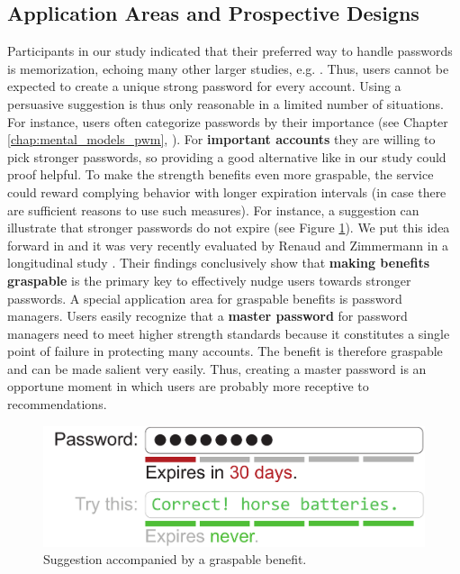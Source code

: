 \subsection{Application Areas and Prospective Designs}
Participants in our study indicated that their preferred way to handle passwords is memorization, echoing many other larger studies, e.g. \cite{CSID2012PasswordHabits, Olmstead2017AmerciansCybersecurity}. Thus, users cannot be expected to create a unique strong password for every account. Using a persuasive suggestion is thus only reasonable in a limited number of situations. For instance, users often categorize passwords by their importance (see Chapter \ref{chap:mental_models_pwm}, \cite{Stobert2014PasswordLifeCycle, Wash2016UnderstandingPasswordChoices}). For \textbf{important accounts} they are willing to pick stronger passwords, so providing a good alternative like in our study could proof helpful. To make the strength benefits even more graspable, the service could reward complying behavior with longer expiration intervals (in case there are sufficient reasons to use such measures). For instance, a suggestion can illustrate that stronger passwords do not expire (see Figure \ref{fig:decoy:expiremockup}). We put this idea forward in \cite{Seitz2016SuggestionsDecoy} and it was very recently evaluated by Renaud and Zimmermann in a longitudinal study \cite{Renaud2018NudgingFolks}. Their findings conclusively show that \textbf{making benefits graspable} is the primary key to effectively nudge users towards stronger passwords. A special application area for graspable benefits is password managers. Users easily recognize that a \textbf{master password} for password managers need to meet higher strength standards because it constitutes a single point of failure in protecting many accounts. The benefit is therefore graspable and can be made salient very easily. Thus, creating a master password is an opportune moment in which users are probably more receptive to recommendations. %


\begin{figure}
	\centering
	\includegraphics[width=0.5\linewidth]{figures/decoy/expire_mockup}
	\caption{\label{fig:decoy:expiremockup}Suggestion accompanied by a graspable benefit.}
\end{figure}

